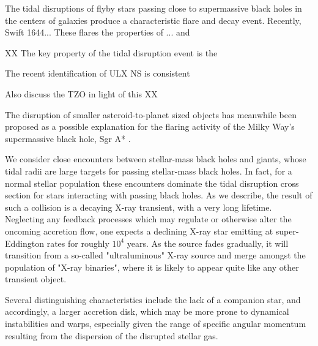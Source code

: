The tidal disruptions of flyby stars passing close to supermassive
black holes in the centers of galaxies produce a characteristic 
flare and decay event.  Recently, Swift 1644...
These flares the properties of ... and 



XX
The key property of the tidal disruption event is the 

The recent identification of ULX NS is consistent 

Also discuss the TZO in light of this
XX


The disruption of smaller asteroid-to-planet sized objects has
meanwhile been proposed as a possible explanation for the flaring
activity of the Milky Way's supermassive black hole, Sgr A* \citep{SSS}.


We consider close encounters between stellar-mass black holes and giants, whose tidal radii are large targets for passing stellar-mass black holes.  In fact, for a normal stellar population these encounters dominate the tidal disruption cross section for stars interacting with passing black holes.  As we describe, the result of such a collision is a decaying X-ray transient, with a very long lifetime.  Neglecting any feedback processes which may regulate or otherwise alter the oncoming accretion flow, one expects a declining X-ray star emitting at super-Eddington rates for roughly $10^4$ years.  As the source fades gradually, it will transition from a so-called "ultraluminous" X-ray source and merge amongst the population of "X-ray binaries", where it is likely to appear quite like any other transient object. 

Several distinguishing characteristics include the lack of a companion star, and accordingly, a larger accretion disk, which may be more prone to dynamical instabilities and warps, especially given the range of specific angular momentum resulting from the dispersion of the disrupted stellar gas.

